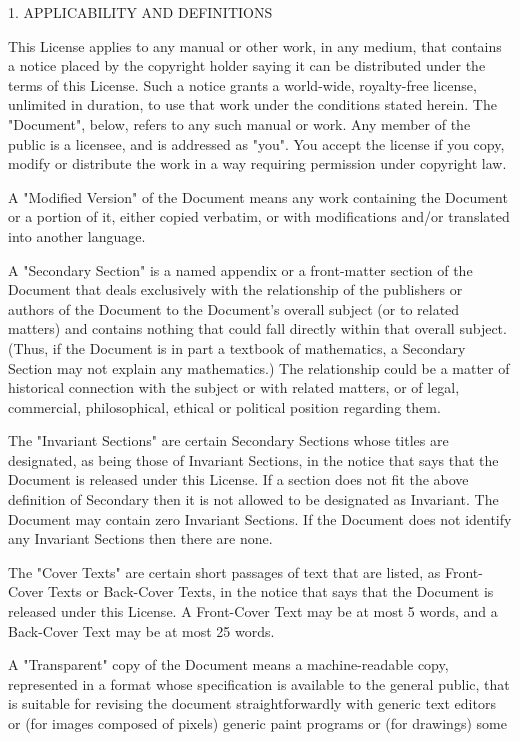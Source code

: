 \documentclass{article}
\begin{document}
1. APPLICABILITY AND DEFINITIONS 

This License applies to any manual or other work, in any medium, that contains a notice placed by the copyright holder saying it can be distributed under the terms of this License. Such a notice grants a world-wide, royalty-free license, unlimited in duration, to use that work under the conditions stated herein. The "Document", below, refers to any such manual or work. Any member of the public is a licensee, and is addressed as "you". You accept the license if you copy, modify or distribute the work in a way requiring permission under copyright law. 

A "Modified Version" of the Document means any work containing the Document or a portion of it, either copied verbatim, or with modifications and/or translated into another language. 

A "Secondary Section" is a named appendix or a front-matter section of the Document that deals exclusively with the relationship of the publishers or authors of the Document to the Document's overall subject (or to related matters) and contains nothing that could fall directly within that overall subject. (Thus, if the Document is in part a textbook of mathematics, a Secondary Section may not explain any mathematics.) The relationship could be a matter of historical connection with the subject or with related matters, or of legal, commercial, philosophical, ethical or political position regarding them. 

The "Invariant Sections" are certain Secondary Sections whose titles are designated, as being those of Invariant Sections, in the notice that says that the Document is released under this License. If a section does not fit the above definition of Secondary then it is not allowed to be designated as Invariant. The Document may contain zero Invariant Sections.  If the Document does not identify any Invariant Sections then there are none. 

The "Cover Texts" are certain short passages of text that are listed, as Front-Cover Texts or Back-Cover Texts, in the notice that says that the Document is released under this License.  A Front-Cover Text may be at most 5 words, and a Back-Cover Text may be at most 25 words. 

A "Transparent" copy of the Document means a machine-readable copy, represented in a format whose specification is available to the general public, that is suitable for revising the document straightforwardly with generic text editors or (for images composed of pixels) generic paint programs or (for drawings) some 
\end{document}
